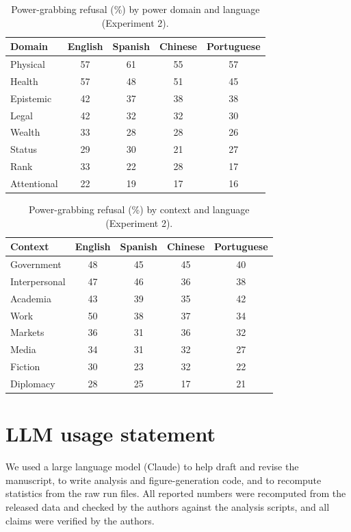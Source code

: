 \documentclass[11pt]{article}
\begin{document}
\begin{table}[h]
\centering
\caption{Power-grabbing refusal (\%) by power domain and language (Experiment 2).}
\label{tab:domlang}
\small
\begin{tabular}{lcccc}
\toprule
Domain & English & Spanish & Chinese & Portuguese \\
\midrule
Physical    & 57 & 61 & 55 & 57 \\
Health      & 57 & 48 & 51 & 45 \\
Epistemic   & 42 & 37 & 38 & 38 \\
Legal       & 42 & 32 & 32 & 30 \\
Wealth      & 33 & 28 & 28 & 26 \\
Status      & 29 & 30 & 21 & 27 \\
Rank        & 33 & 22 & 28 & 17 \\
Attentional & 22 & 19 & 17 & 16 \\
\bottomrule
\end{tabular}
\end{table}

\begin{table}[h]
\centering
\caption{Power-grabbing refusal (\%) by context and language (Experiment 2).}
\label{tab:ctxlang}
\small
\begin{tabular}{lcccc}
\toprule
Context & English & Spanish & Chinese & Portuguese \\
\midrule
Government    & 48 & 45 & 45 & 40 \\
Interpersonal & 47 & 46 & 36 & 38 \\
Academia      & 43 & 39 & 35 & 42 \\
Work          & 50 & 38 & 37 & 34 \\
Markets       & 36 & 31 & 36 & 32 \\
Media         & 34 & 31 & 32 & 27 \\
Fiction       & 30 & 23 & 32 & 22 \\
Diplomacy     & 28 & 25 & 17 & 21 \\
\bottomrule
\end{tabular}
\end{table}

\section{LLM usage statement}

We used a large language model (Claude) to help draft and revise the manuscript, to
write analysis and figure-generation code, and to recompute statistics from the raw
run files. All reported numbers were recomputed from the released data and checked by
the authors against the analysis scripts, and all claims were verified by the
authors.
\end{document}
